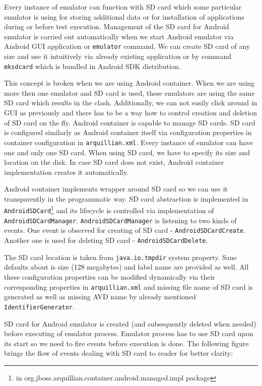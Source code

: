 \documentclass[12pt,final,oneside]{fithesis}
\begin{document}
Every instance of emulator can function with SD card which some particular emulator is using for storing additional data or for installation of applications during or before test execution. Management of the SD card for Android emulator is carried out automatically when we start Android emulator via Android GUI application or \texttt{emulator} command. We can create SD card of any size and use it intuitively via already existing application or by command \texttt{mksdcard} which is bundled in Android SDK distribution.

This concept is broken when we are using Android container. When we are using more then one emulator and SD card is used, these emulators are using the same SD card which results in the clash. Additionally, we can not easily click around in GUI as previously and there has to be a way how to control creation and deletion of SD card on the fly. Android container is capable to manage SD cards. SD card is configured similarly as Android container itself via configuration properties in container configuration in \texttt{arquillian.xml}. Every instance of emulator can have one and only one SD card. When using SD card, we have to specify its size and location on the disk. In case SD card does not exist, Android container implementation creates it automatically.

Android container implements wrapper around SD card so we can use it transparently in the programmatic way. SD card abstraction is implemented in \texttt{AndroidSDCard}\footnote{in org.jboss.arquillian.container.android.managed.impl package} and its lifecycle is controlled via implementation of \texttt{AndroidSDCardManager}. \texttt{AndroidSDCardManager} is listening to two kinds of events. One event is observed for creating of SD card - \texttt{AndroidSDCardCreate}. Another one is used for deleting SD card - \texttt{AndroidSDCardDelete}.

The SD card location is taken from \texttt{java.io.tmpdir} system property. Sane defaults about is size (128 megabytes) and label name are provided as well. All these configuration properties can be modified dynamically via their corresponding properties in \texttt{arquillian.xml} and missing file name of SD card is generated as well as missing AVD name by already mentioned \texttt{IdentifierGenerator}.

SD card for Android emulator is created (and subsequently deleted when needed) before executing of emulator process. Emulator process has to use SD card upon its start so we need to fire events before execution is done. The following figure brings the flow of events dealing with SD card to reader for better clarity:
\end{document}
